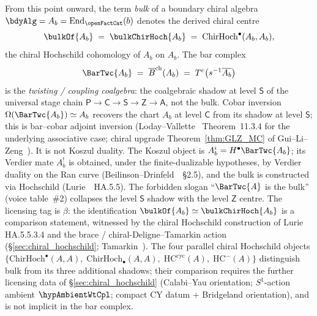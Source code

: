 \providecommand{\IC}{\mathrm{IC}}

\begin{remark}
\label{rem:bar-vs-centre-canonical}%
%
%
%
From this point onward, the term \emph{bulk} of a boundary chiral
algebra $\bdyAlg = A_b = \mathrm{End}_{\openFactCat}(b)$
denotes the derived chiral centre
\[
 \bulkOf{A_b} \;=\; \bulkChirHoch{A_b}
 \;=\; \mathrm{ChirHoch}^{\bullet}(A_b, A_b),
\]
the chiral Hochschild cohomology of $A_b$ on $A_b$. The bar
complex
\[
 \BarTwc{A_b} \;=\; \overline{B}^{\mathrm{ch}}(A_b)
 \;=\; T^c\bigl(s^{-1}\overline{A_b}\bigr)
\]
is the \emph{twisting / coupling coalgebra}: the coalgebraic
shadow at level $\mathsf{S}$ of the universal stage chain
$\mathsf{P} \to \mathsf{C} \to \mathsf{S} \to \mathsf{Z} \to \mathsf{A}$,
not the bulk. Cobar inversion $\Omega(\BarTwc{A_b}) \simeq A_b$
recovers the chart $A_b$ at level $\mathsf{C}$ from its shadow at
level $\mathsf{S}$; this is bar--cobar adjoint
inversion (Loday--Vallette~\cite{LV12} Theorem~11.3.4 for the
underlying associative case; chiral upgrade
Theorem~\ref{thm:GLZ_MC} of Gui--Li--Zeng~\cite{GLZ22}). It is not
Koszul duality. The Koszul object is
$A_b^i = H^\bullet\BarTwc{A_b}$; its Verdier mate $A_b^!$ is obtained,
under the finite-dualizable hypotheses, by Verdier duality on the Ran
curve (Beilinson--Drinfeld~\cite{BD04}~\S2.5), and the bulk is
constructed via Hochschild
(Lurie~\cite{LurieHA}~HA.5.5).
The forbidden slogan ``$\BarTwc{A}$ is the bulk'' (voice
table~\#2) collapses the level $\mathsf{S}$ shadow with the
level $\mathsf{Z}$ centre. The licensing tag is $\beta$: the
identification $\bulkOf{A_b} \simeq \bulkChirHoch{A_b}$ is a
comparison statement, witnessed by the chiral
Hochschild construction of Lurie~\cite{LurieHA} HA.5.5.3.4 and
the brace / chiral-Deligne--Tamarkin action
(\S\ref{sec:chiral_hochschild}; Tamarkin~\cite{Tamarkin2003}).
The four parallel chiral Hochschild objects
$\{\mathrm{ChirHoch}^{\bullet}(A, A),\;
\mathrm{ChirHoch}_{\bullet}(A, A),\;
\mathrm{HC}^{\mathrm{cyc}}(A),\;
\mathrm{HC}^{-}(A)\}$
distinguish bulk from its three additional shadows; their
comparison requires the further licensing data of
\S\ref{sec:chiral_hochschild} (Calabi--Yau orientation;
$S^1$-action ambient $\hypAmbientWtCpl$; compact CY datum + Bridgeland
orientation), and is not implicit in the bar complex.
\end{remark}

